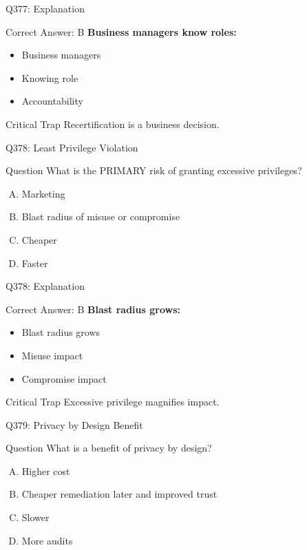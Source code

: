 \documentclass{beamer}
\begin{document}
	\begin{frame}{Q377: Explanation}
		\begin{block}{Correct Answer: B}
			\textbf{Business managers know roles:}
			\begin{itemize}
				\item Business managers
				\item Knowing role
				\item Accountability
			\end{itemize}
		\end{block}
		\begin{alertblock}{Critical Trap}
			Recertification is a business decision.
		\end{alertblock}
	\end{frame}
	
	\begin{frame}{Q378: Least Privilege Violation}
		\begin{block}{Question}
			What is the PRIMARY risk of granting excessive privileges?
		\end{block}
		\begin{enumerate}[(A)]
			\item Marketing
			\item Blast radius of misuse or compromise
			\item Cheaper
			\item Faster
		\end{enumerate}
	\end{frame}
	
	\begin{frame}{Q378: Explanation}
		\begin{block}{Correct Answer: B}
			\textbf{Blast radius grows:}
			\begin{itemize}
				\item Blast radius grows
				\item Misuse impact
				\item Compromise impact
			\end{itemize}
		\end{block}
		\begin{alertblock}{Critical Trap}
			Excessive privilege magnifies impact.
		\end{alertblock}
	\end{frame}
	
	\begin{frame}{Q379: Privacy by Design Benefit}
		\begin{block}{Question}
			What is a benefit of privacy by design?
		\end{block}
		\begin{enumerate}[(A)]
			\item Higher cost
			\item Cheaper remediation later and improved trust
			\item Slower
			\item More audits
		\end{enumerate}
	\end{frame}
	
\end{document}
